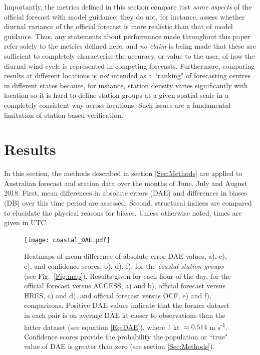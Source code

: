 \documentclass{ametsoc}
\begin{document}
Importantly, the metrics defined in this section compare just \textit{some aspects} of the official forecast with model guidance: they do not, for instance, assess whether diurnal variance of the official forecast is more realistic than that of model guidance. Thus, any statements about performance made throughout this paper refer solely to the metrics defined here, and \textit{no claim} is being made that these are sufficient to completely characterise the accuracy, or value to the user, of how the diurnal wind cycle is represented in competing forecasts. Furthermore, comparing results at different locations is \textit{not} intended as a ``ranking" of forecasting centres in different states because, for instance, station density varies significantly with location so it is hard to define station groups at a given spatial scale in a completely consistent way across locations. Such issues are a fundamental limitation of station based verification.

\section{Results}
\label{Sec:Results}
In this section, the methods described in section \ref{Sec:Methods} are applied to Australian forecast and station data over the months of June, July and August 2018. First, mean differences in absolute errors (DAE) and differences in biases (DB) over this time period are assessed. Second, structural indices are compared to elucidate the physical reasons for biases. Unless otherwise noted, times are given in UTC.

\begin{figure}
\centering
\texttt{[image: coastal\_DAE.pdf]}
\caption{Heatmaps of mean difference of absolute error $\overline{\text{DAE}}$ values, a), c), e), and confidence scores, b), d), f), for the \textit{coastal station groups} (see Fig.~\ref{Fig:map}). Results given for each hour of the day, for the official forecast versus ACCESS, a) and b), official forecast versus HRES, c) and d), and official forecast versus OCF, e) and f), comparisons. Positive $\overline{\text{DAE}}$ values indicate that the former dataset in each pair is on average $\overline{\text{DAE}}$ kt closer to observations than the latter dataset (see equation \ref{Eq:DAE}), where $1$ kt $\approx 0.514$ m s\textsuperscript{-1}. Confidence scores provide the probability the population or ``true" value of $\overline{\text{DAE}}$ is greater than zero (see section \ref{Sec:Methods}).}
\label{Fig:coastal_DAE}
\end{figure}
\end{document}

